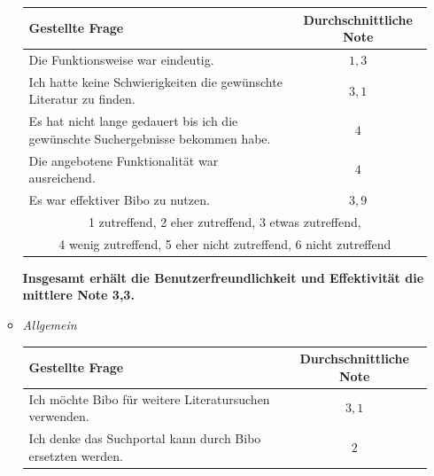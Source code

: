 \documentclass[12pt,a4paper]{scrartcl}
\begin{document}
\begin{enumerate}
\begin{itemize}
\begin{center}
\begin{tabularx}{\linewidth}{|X|c|}
\hline
Gestellte Frage & Durchschnittliche Note  \\ \hline
Die Funktionsweise war eindeutig. & $1,3$ \\ \hline

Ich hatte keine Schwierigkeiten die gewünschte Literatur zu finden. & $3,1$\\ \hline

Es hat nicht lange gedauert bis ich die gewünschte Suchergebnisse bekommen habe.& $4$\\ \hline

Die angebotene Funktionalität war ausreichend.& $4$ \\ \hline

Es war effektiver Bibo zu nutzen. & $3,9$ \\ \hline

\multicolumn{2}{|c|}{1 zutreffend, 2 eher zutreffend, 3 etwas zutreffend,}\\
\multicolumn{2}{|c|}{4 wenig zutreffend, 5 eher nicht zutreffend, 6 nicht zutreffend} \\ \hline

\end{tabularx}
\end{center}
\textbf{Insgesamt erhält die Benutzerfreundlichkeit und Effektivität die mittlere Note 3,3.}
\newpage
\item \textit{Allgemein}
\begin{center}
\begin{tabularx}{\linewidth}{|X|c|}

\hline
Gestellte Frage & Durchschnittliche Note  \\ \hline
Ich möchte Bibo für weitere Literatursuchen verwenden. & $3,1$ \\ \hline


Ich denke das Suchportal kann durch Bibo ersetzten werden. & $2$ \\ \hline


\end{tabularx}
\end{center}
\end{itemize}
\end{enumerate}
\end{document}
